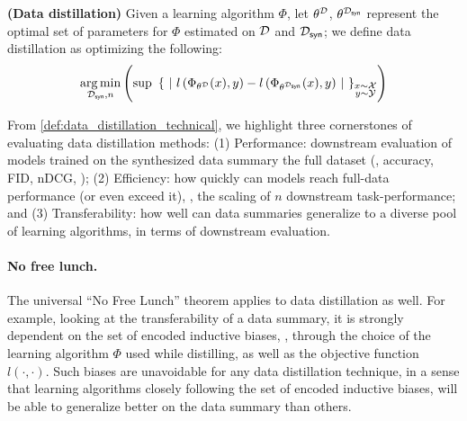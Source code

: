 \documentclass[10pt]{article} %
\begin{document}
\begin{mydefinition} \label{def:data_distillation_technical}
    {\normalfont \textbf{(Data distillation)}} Given a learning algorithm $\Phi$, let $\theta^{\mathcal{D}}$, $\theta^{\mathcal{D}_{\mathsf{syn}}}$ represent the optimal set of parameters for $\Phi$ estimated on $\mathcal{D}$ and $\mathcal{D}_{\mathsf{syn}}$; we define data distillation as optimizing the following:
    \begin{equation} \label{eqn:dd_optimization}
        \underset{\distill, n}{\operatorname{arg} \operatorname{min}} \left( \operatorname{sup} ~ \left\{ ~ \left\vert \ l\left(\Phi_{\theta^{\dataset}}(x), y\right) - l\left(\Phi_{\theta^{\distill}}(x), y\right) \ \right\vert ~ \right\}_{\raisebox{6pt}{$\substack{x \sim \mathcal{X}\\y \sim \mathcal{Y}}$}} \right)
    \end{equation}
\end{mydefinition}

From \cref{def:data_distillation_technical}, we highlight three cornerstones of evaluating data distillation methods: (1) Performance: downstream evaluation of models trained on the synthesized data summary \vs the full dataset (\eg, accuracy, FID, nDCG, \etc); (2) Efficiency: how quickly can models reach full-data performance (or even exceed it), \ie, the scaling of $n$ \vs downstream task-performance; and (3) Transferability: how well can data summaries generalize to a diverse pool of learning algorithms, in terms of downstream evaluation.

\paragraph{No free lunch.} The universal ``No Free Lunch'' theorem \citep{no_free_lunch} applies to data distillation as well. 
For example, looking at the transferability of a data summary, it
is strongly dependent on the set of encoded inductive biases, \ie, through the choice of the learning algorithm $\Phi$ used while distilling, as well as the objective function $l(\cdot, \cdot)$. Such biases are unavoidable for any data distillation technique, 
in a sense that learning algorithms closely following the set of encoded inductive biases, will be able to generalize better on the data summary than others.
\end{document}
